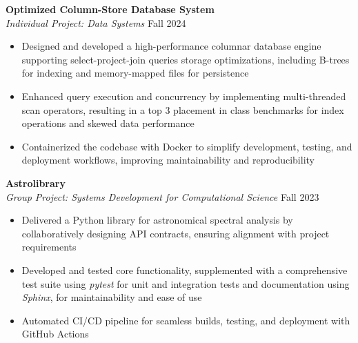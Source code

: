 \documentclass[11pt,a4paper]{article}
\newcommand{\subheading}[1]{\textbf{#1}}
\newcommand{\daterange}[1]{\hfill{#1}}
\begin{document}
\subheading{Optimized Column-Store Database System}\\
\textit{Individual Project: Data Systems} \daterange{Fall 2024}
\begin{itemize}[leftmargin=*,nosep]
    \item Designed and developed a high-performance columnar database engine supporting select-project-join queries storage optimizations, including B-trees for indexing and memory-mapped files for persistence
    \item Enhanced query execution and concurrency by implementing multi-threaded scan operators, resulting in a top 3 placement in class benchmarks for index operations and skewed data performance
    \item Containerized the codebase with Docker to simplify development, testing, and deployment workflows, improving maintainability and reproducibility
\end{itemize}

\subheading{Astrolibrary} \\
\textit{Group Project: Systems Development for Computational Science} \daterange{Fall 2023}
\begin{itemize}[leftmargin=*,nosep]
    \item Delivered a Python library for astronomical spectral analysis by collaboratively designing API contracts, ensuring alignment with project requirements
    \item Developed and tested core functionality, supplemented with a comprehensive test suite using \textit{pytest} for unit and integration tests and documentation using \textit{Sphinx}, for maintainability and ease of use
    \item Automated CI/CD pipeline for seamless builds, testing, and deployment with GitHub Actions
\end{itemize}
\end{document}
